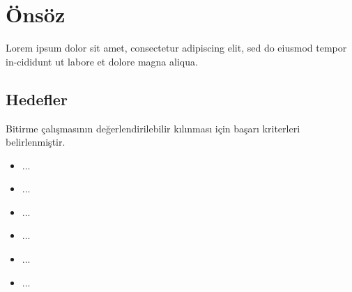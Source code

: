 \section{Önsöz}
Lorem  ipsum  dolor  sit  amet,  consectetur  adipiscing  elit,  sed  do  eiusmod  tempor  in-cididunt  ut  labore  et  dolore  magna  aliqua. 



\subsection{Hedefler}
Bitirme çalışmasının değerlendirilebilir kılınması için başarı kriterleri belirlenmiştir.
\begin{itemize}
  \item ...
  \item ...
  \item ...
  \item ...
  \item ...
  \item ...
\end{itemize}


